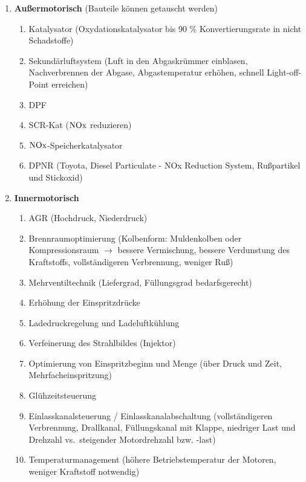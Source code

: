 \begin{enumerate}
\item
  \textbf{Außermotorisch} (Bauteile können getauscht werden)

  \begin{enumerate}
  \def\labelenumii{\arabic{enumii}.}
  \item
    Katalysator (Oxydationskatalysator bis 90 \% Konvertierungsrate in
    nicht Schadstoffe)
  \item
    Sekundärluftsystem (Luft in den Abgaskrümmer einblasen,
    Nachverbrennen der Abgase, Abgastemperatur erhöhen, schnell
    Light-off-Point erreichen)
  \item
    DPF
  \item
    SCR-Kat ($\ce{NOx}$ reduzieren)
  \item
    $\ce{NOx}$-Speicherkatalysator
  \item
    DPNR (Toyota, Diesel Particulate - NOx Reduction System, Rußpartikel
    und Stickoxid)
  \end{enumerate}
\item
  \textbf{Innermotorisch}

  \begin{enumerate}
  \def\labelenumii{\arabic{enumii}.}
  \item
    AGR (Hochdruck, Niederdruck)
  \item
    Brennraumoptimierung (Kolbenform: Muldenkolben oder Kompressionsraum
    $\to$ bessere Vermischung, bessere Verdunstung des Kraftstoffs,
    vollständigeren Verbrennung, weniger Ruß)
  \item
    Mehrventiltechnik (Liefergrad, Füllungsgrad bedarfsgerecht)
  \item
    Erhöhung der Einspritzdrücke
  \item
    Ladedruckregelung und Ladeluftkühlung
  \item
    Verfeinerung des Strahlbildes (Injektor)
  \item
    Optimierung von Einspritzbeginn und Menge (über Druck und Zeit,
    Mehrfacheinspritzung)
  \item
    Glühzeitsteuerung
  \item
    Einlasskanalsteuerung / Einlasskanalabschaltung (vollständigeren
    Verbrennung, Drallkanal, Füllungskanal mit Klappe, niedriger Last
    und Drehzahl vs.~steigender Motordrehzahl bzw. -last)
  \item
    Temperaturmanagement (höhere Betriebstemperatur der Motoren, weniger
    Kraftstoff notwendig)
  \end{enumerate}
\end{enumerate}

